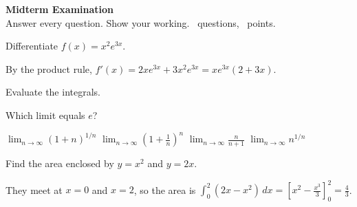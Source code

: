 \documentclass[11pt,addpoints,answers]{exam}
\begin{document}
\begin{center}
  {\Large\bfseries Midterm Examination}\\[4pt]
  Answer every question. Show your working. \numquestions\ questions, \numpoints\ points.
\end{center}
\vspace{4pt}
\begin{center}\gradetable[h][questions]\end{center}

\begin{questions}

\question[6] Differentiate $f(x) = x^2 e^{3x}$.
\begin{solution}
By the product rule, $f'(x) = 2x e^{3x} + 3x^2 e^{3x} = x e^{3x}(2 + 3x)$.
\end{solution}

\question Evaluate the integrals.

\question[3] Which limit equals $e$?
\begin{choices}
  \choice $\lim_{n\to\infty} (1 + n)^{1/n}$
  \CorrectChoice $\lim_{n\to\infty} \left(1 + \tfrac1n\right)^{n}$
  \choice $\lim_{n\to\infty} \tfrac{n}{n+1}$
  \choice $\lim_{n\to\infty} n^{1/n}$
\end{choices}

\question[7] Find the area enclosed by $y = x^2$ and $y = 2x$.
\begin{solution}
They meet at $x = 0$ and $x = 2$, so the area is
$\int_0^2 (2x - x^2)\,dx = \left[x^2 - \tfrac{x^3}{3}\right]_0^2 = \tfrac43$.
\end{solution}

\end{questions}
\end{document}
